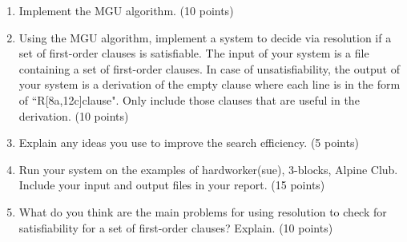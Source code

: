﻿\documentclass[a4paper, 11pt]{article}
\begin{document}
\begin{enumerate}
\item  Implement the MGU algorithm. (10 points)
\item Using the MGU algorithm, implement a system to decide via resolution if a set of first-order clauses is satisfiable.
The input of your system is a file containing a set of first-order clauses.
In case of unsatisfiability, the output of your system is a derivation of the empty clause where each line is in the form of ``R[8a,12c]clause". Only include those clauses that are useful in the derivation. (10 points)
\item Explain any ideas you use to improve the search efficiency. (5 points)

\item Run your system on the examples of hardworker(sue), 3-blocks, Alpine Club. Include your input and output files in your report. (15 points)

\item What do you think are the main problems for using resolution to check for satisfiability for a set of first-order clauses? Explain. (10 points)

\end{enumerate}
\end{document}
